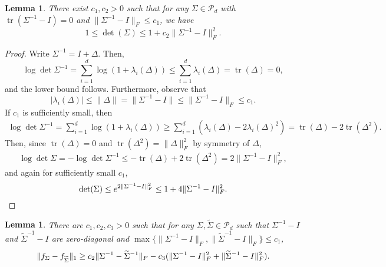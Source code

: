 \documentclass[letterpaper]{amsart}
\DeclarePairedDelimiter{\norm}{\lVert}{\rVert}
\newcommand{\sP}{\mathcal{P}}
\DeclareMathOperator{\tr}{tr}
\numberwithin{thm}{section}
\newtheorem{lem}[thm]{Lemma}{\bfseries}{\itshape}
\newcommand{\lemlabel}[1]{\label{lem:#1}}
\theoremstyle{definition}
\theoremstyle{plain}
\renewcommand{\tilde}[1]{\widetilde{#1}}
\begin{document}
\begin{lem}\lemlabel{determinants}
  There exist $c_1, c_2 > 0$ such that for any $\Sigma \in \sP_d$ with
  $\tr(\Sigma^{-1} - I) = 0$ and $\|\Sigma^{-1} - I\|_F \le c_1$, we
  have
  \[
    1 \leq \det(\Sigma)  \le 1 + c_2 \|\Sigma^{-1} - I\|_F^2 .
  \]
\end{lem}
\begin{proof}
  Write $\Sigma^{-1} = I + \Delta$. Then,
  \[
    \log \det \Sigma^{-1} = \sum_{i = 1}^d \log (1 + \lambda_i(\Delta)) \le \sum_{i = 1}^d \lambda_i(\Delta) = \tr(\Delta) = 0 ,
  \]
  and the lower bound follows. Furthermore, observe that
  \[
    |\lambda_i(\Delta)| \le \|\Delta\|=\|\Sigma^{-1} - I\| \le \|\Sigma^{-1} - I\|_F \le c_1 .
  \]
  If $c_1$ is sufficiently small, then
  \begin{align*}
    \log \det \Sigma^{-1} = \sum_{i = 1}^d \log (1 + \lambda_i(\Delta)) 
    \ge \sum_{i = 1}^d (\lambda_i(\Delta) - 2 \lambda_i(\Delta)^2) 
    = \tr(\Delta) - 2 \tr(\Delta^2) .
  \end{align*}
  Then, since $\tr(\Delta) = 0$ and 
  $\tr(\Delta^2) = \|\Delta\|_F^2$ by symmetry of $\Delta$,
  \begin{align*}
    \log \det \Sigma =-\log \det \Sigma^{-1} \le -\tr(\Delta)+2 \tr(\Delta^2) = 2 \|\Sigma^{-1} - I\|_F^2 ,
  \end{align*}
  and again for sufficiently small $c_1$,
  \[
    \det(\Sigma) \le e^{2 \|\Sigma^{-1} - I\|_F^2} \le 1 + 4 \|\Sigma^{-1} - I\|_F^2 . \qedhere
  \]
\end{proof}

\begin{lem}\lemlabel{normal-l1}
  There are $c_1, c_2, c_3 > 0$ such that for any
  $\Sigma, \tilde{\Sigma} \in \sP_d$ such that $\Sigma^{-1} - I$ and
  $\tilde{\Sigma}^{-1} - I$ are zero-diagonal and
  $\max\{\|\Sigma^{-1} - I\|_F, \|\tilde{\Sigma}^{-1} - I\|_F\} \le
  c_1$,
  \[
    \norm{f_{\Sigma} - f_{\tilde{\Sigma}}}_1 \ge c_2 \|\Sigma^{-1} - \tilde{\Sigma}^{-1}\|_F - c_3 (\|\Sigma^{-1} - I\|_F^2 + \|\tilde{\Sigma}^{-1} - I\|_F^2) .
  \]
\end{lem}
\end{document}
